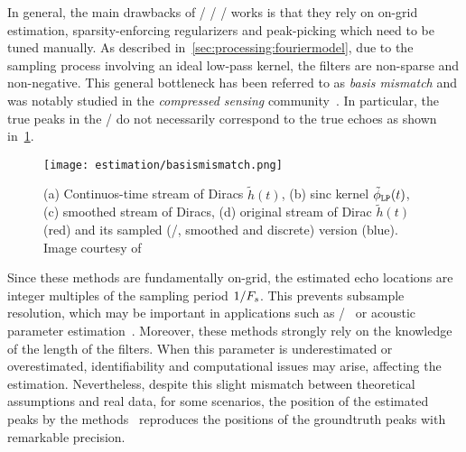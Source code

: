 \mynewline
In general, the main drawbacks of \FIR/ \SIMO/ \BCE/ works is that they rely on on-grid estimation, sparsity-enforcing regularizers and peak-picking which need to be tuned manually.
As described in~\cref{sec:processing:fouriermodel}, due to the sampling process involving an ideal low-pass kernel, the filters are non-sparse and non-negative.
This general bottleneck has been referred to as \textit{basis mismatch} and was notably studied in the \textit{compressed sensing} community~.
In particular, the true peaks in the \RIR/ do not necessarily correspond to the true echoes as shown in~\cref{fig:estimation:mismatch}.
\begin{figure}[h]
    \begin{fullwidth}
        \centering
        \texttt{[image: estimation/basismismatch.png]}
        \caption{%
        (a) Continuos-time stream of Diracs $\tilde{h}(t)$,
        (b) sinc kernel $\lowpassfilter(t)$,
        (c) smoothed stream of Diracs,
        (d) original stream of Dirac $\tilde{h}(t)$ (red) and its sampled (\ie/, smoothed and discrete) version (blue).
        Image courtesy of~
        }
        \label{fig:estimation:mismatch}
    \end{fullwidth}
\end{figure}
Since these methods are fundamentally on-grid, the estimated echo locations are integer multiples of the sampling period $1/F_s$.
This prevents subsample resolution, which may be important in applications such as \RooGE/~ or acoustic parameter estimation~.
Moreover, these methods strongly rely on the knowledge of the length of the filters.
When this parameter is underestimated or overestimated, identifiability and computational issues may arise, affecting the estimation.
Nevertheless, despite this slight mismatch between theoretical assumptions and real data, for some scenarios, the position of the estimated peaks by the methods~ reproduces the positions of the groundtruth peaks with remarkable precision.

